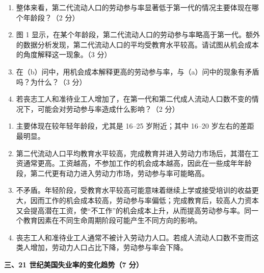 \begin{question}
\begin{enumerate}[label=(\alph*),leftmargin=2.5em]
  \item 整体来看，第二代流动人口的劳动参与率显著低于第一代的情况主要体现在哪个年龄段？（2 分）
  \item 图 1 显示，在某个年龄段，第二代流动人口的劳动参与率略高于第一代。额外的数据分析发现，第二代流动人口的平均受教育水平较高。请试图从机会成本的角度解释这一现象。（3 分）
  \item 在（b）问中，用机会成本解释更高的劳动参与率，与（a）问中的现象有矛盾吗？为什么？（3 分）
  \item 若丧志工人和准待业工人增加了，在第一代和第二代成人流动人口数不变的情况下，可能会对劳动参与率造成什么影响？（2 分）
\end{enumerate}
\begin{solution}
\begin{enumerate}[label=(\alph*),leftmargin=2.5em]
  \item 主要体现在较年轻年龄段，尤其是 16--25 岁附近；其中 16--20 岁左右的差距最明显。
  \item 第二代流动人口平均教育水平较高，完成教育并进入劳动力市场后，其潜在工资通常更高。工资越高，不参加工作的机会成本越高，因此在一些成年年龄段，第二代更有动力进入劳动力市场，劳动参与率可能略高。
  \item 不矛盾。年轻阶段，受教育水平较高可能意味着继续上学或接受培训的收益更大，因而工作的机会成本较高，劳动参与率偏低；完成教育后，较高人力资本又会提高潜在工资，使“不工作”的机会成本上升，从而提高劳动参与率。同一个教育因素在不同生命周期阶段可能产生不同方向的影响。
  \item 丧志工人和准待业工人通常不被计入劳动力人口。若成人流动人口数不变而这类人增加，劳动力人口占比下降，劳动参与率会下降。
\end{enumerate}
\end{solution}
\end{question}

\textbf{三、21 世纪美国失业率的变化趋势（7 分）}

